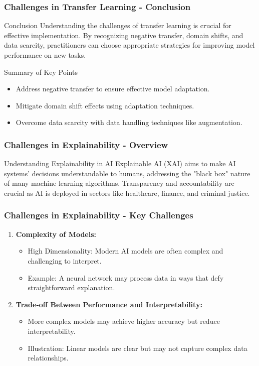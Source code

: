 \documentclass[aspectratio=169]{beamer}
\begin{document}
\begin{frame}[fragile]
  \frametitle{Challenges in Transfer Learning - Conclusion}
  \begin{block}{Conclusion}
    Understanding the challenges of transfer learning is crucial for effective 
    implementation. By recognizing negative transfer, domain shifts, and data scarcity, 
    practitioners can choose appropriate strategies for improving model performance on 
    new tasks.
  \end{block}

  \begin{block}{Summary of Key Points}
    \begin{itemize}
      \item Address negative transfer to ensure effective model adaptation.
      \item Mitigate domain shift effects using adaptation techniques.
      \item Overcome data scarcity with data handling techniques like augmentation.
    \end{itemize}
  \end{block}
\end{frame}

\begin{frame}[fragile]
    \frametitle{Challenges in Explainability - Overview}
    \begin{block}{Understanding Explainability in AI}
        Explainable AI (XAI) aims to make AI systems' decisions understandable to humans, addressing the "black box" nature of many machine learning algorithms. Transparency and accountability are crucial as AI is deployed in sectors like healthcare, finance, and criminal justice.
    \end{block}
\end{frame}

\begin{frame}[fragile]
    \frametitle{Challenges in Explainability - Key Challenges}
    \begin{enumerate}
        \item \textbf{Complexity of Models:}
            \begin{itemize}
                \item High Dimensionality: Modern AI models are often complex and challenging to interpret.
                \item Example: A neural network may process data in ways that defy straightforward explanation.
            \end{itemize}
        
        \item \textbf{Trade-off Between Performance and Interpretability:}
            \begin{itemize}
                \item More complex models may achieve higher accuracy but reduce interpretability.
                \item Illustration: Linear models are clear but may not capture complex data relationships.
            \end{itemize}
    \end{enumerate}
\end{frame}
\end{document}
